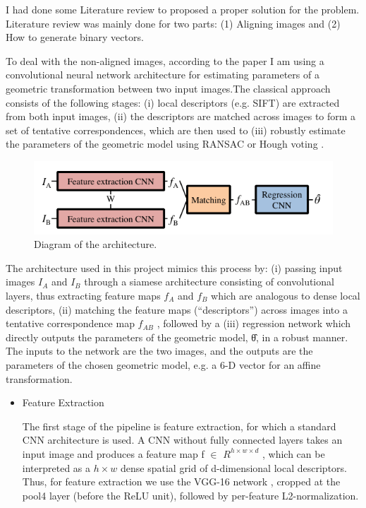 \documentclass[12pt, a4paper,twoside]{article}
\begin{document}
\label{sec:workBefore}
	I had done some Literature review to proposed a proper solution for the problem. Literature review was mainly done for two parts: (1) Aligning images and (2) How to generate binary vectors.

	To deal with the non-aligned images, according to the paper \cite{align} I am using a convolutional neural network architecture for estimating parameters of a geometric transformation between two input images.The classical approach consists of the following stages: (i) local descriptors (e.g. SIFT) are extracted from both input images, (ii) the descriptors are matched across images to form a set of tentative correspondences, which are then used to (iii) robustly estimate the parameters of the geometric model using RANSAC or Hough voting \cite{34b}.

\begin{figure}[htbp]
\centering
\includegraphics[scale=0.5]{images/AlignmentNetwork}
\caption{ Diagram of the architecture.
}\label{fig:figure3}
\end{figure} 

	The architecture used in this project mimics this process by: (i) passing input images $I_{A}$ and $I_{B}$ through a siamese architecture consisting of convolutional layers, thus extracting feature maps $f_{A}$ and $f_{B}$ which are analogous to dense local descriptors, (ii) matching the feature maps (“descriptors”) across images into a tentative correspondence map $f_{AB}$ , followed by a (iii) regression network which directly outputs the parameters of the geometric model, θ̂, in a robust manner. The inputs to the network are the two images, and the outputs are the parameters of the chosen geometric model, e.g. a 6-D vector for an affine transformation.

\begin{itemize}
  \item Feature Extraction

	The first stage of the pipeline is feature extraction, for which a standard CNN architecture is used. A CNN without fully connected layers takes an input image and produces a feature map f $\in$ $R^{ h\times w\times d}$ , which can be interpreted as a $h \times w$ dense spatial grid of d-dimensional local descriptors. Thus, for feature extraction we use the VGG-16 network \cite{48b}, cropped at the pool4 layer (before the ReLU unit), followed by per-feature L2-normalization.
\end{itemize}
\end{document}
